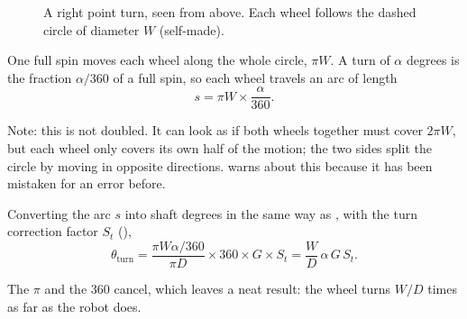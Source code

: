 \begin{figure}[h]
  \centering
  \caption{A right point turn, seen from above. Each wheel follows the dashed circle of diameter $W$ (self-made).}
  \label{fig:turn}
\end{figure}

One full spin moves each wheel along the whole circle, $\pi W$. A turn of
$\alpha$ degrees is the fraction $\alpha/360$ of a full spin, so each wheel
travels an arc of length
\begin{equation}
  s = \pi W \times \frac{\alpha}{360} .
  \label{eq:arc}
\end{equation}

Note: this is not doubled. It can look as if both wheels together must cover
$2\pi W$, but each wheel only covers its own half of the motion; the two sides
split the circle by moving in opposite directions.  warns
about this because it has been mistaken for an error before.

Converting the arc $s$ into shaft degrees in the same way as ,
with the turn correction factor $S_t$ (),
\begin{equation}
  \theta_{\text{turn}} = \frac{\pi W \alpha / 360}{\pi D} \times 360 \times G \times S_t
                       = \frac{W}{D}\,\alpha\, G\, S_t .
  \label{eq:turn}
\end{equation}

The $\pi$ and the 360 cancel, which leaves a neat result: the wheel turns
$W/D$ times as far as the robot does.

